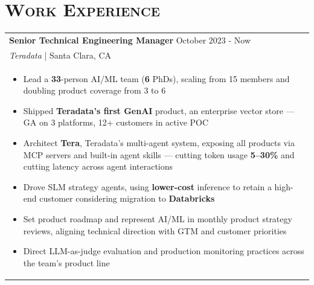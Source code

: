 \documentclass[letterpaper,11pt]{article} %
\begin{document}
\section{\Large\bf\textsc{Work Experience}}
\begin{tabular}{p{18.5cm}}

{\bf Senior Technical Engineering Manager} \hfill October 2023 - Now\\
{\it{Teradata}}  | Santa Clara, CA\\



\begin{itemize}
\item Lead a \textbf{33}-person AI/ML team (\textbf{6} PhDs), scaling from 15 members and doubling product coverage from 3 to 6
\item Shipped \textbf{Teradata's first GenAI} product, an enterprise vector store — GA on 3 platforms, 12+ customers in active POC
\item Architect \textbf{Tera}, Teradata's multi-agent system, exposing all products via MCP servers and built-in agent skills — cutting token usage \textbf{5–30\%}  and cutting latency across agent interactions
\item Drove SLM strategy agents, using \textbf{lower-cost} inference to retain a high-end customer considering migration to \textbf{Databricks}
\item Set product roadmap and represent AI/ML in monthly product strategy reviews, aligning technical direction with GTM and customer priorities
\item Direct LLM-as-judge evaluation and production monitoring practices across the team's product line




\end{itemize}
\end{tabular}
\end{document}
